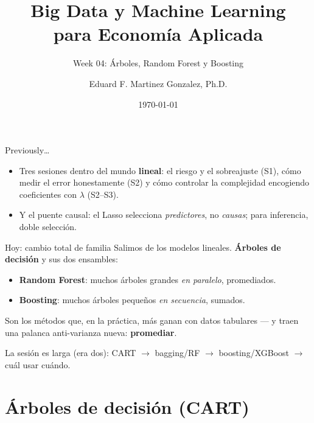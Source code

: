 \documentclass{beamer}
\title[BDML]{Big Data y Machine Learning \\ para Economía Aplicada}
\subtitle{Week 04: Árboles, Random Forest y Boosting}
\author{Eduard F. Martinez Gonzalez, Ph.D.}
\institute[]{Departamento de Economía, Universidad Icesi}
\date{\today}
\newcommand{\1}{\mathbb{I}}
\begin{document}
\begin{frame}
\titlepage
\end{frame}

\begin{frame}{Previously\ldots}
\small
\begin{itemize}\itemsep5pt
  \item Tres sesiones dentro del mundo \textbf{lineal}: el riesgo y el sobreajuste (S1), cómo medir el error honestamente (S2) y cómo controlar la complejidad encogiendo coeficientes con $\lambda$ (S2--S3).
  \item Y el puente causal: el Lasso selecciona \emph{predictores}, no \emph{causas}; para inferencia, doble selección.
\end{itemize}
\pause

\vspace{0.2cm}
\begin{block}{Hoy: cambio total de familia}
Salimos de los modelos lineales. \textbf{Árboles de decisión} y sus dos ensambles:
\begin{itemize}\itemsep2pt
  \item \textbf{Random Forest}: muchos árboles grandes \emph{en paralelo}, promediados.
  \item \textbf{Boosting}: muchos árboles pequeños \emph{en secuencia}, sumados.
\end{itemize}
Son los métodos que, en la práctica, más ganan con datos tabulares --- y traen una palanca anti-varianza nueva: \textbf{promediar}.
\end{block}
\pause

\vspace{0.1cm}
La sesión es larga (era dos): CART $\rightarrow$ bagging/RF $\rightarrow$ boosting/XGBoost $\rightarrow$ cuál usar cuándo.
\end{frame}


\section{Árboles de decisión (CART)}
\begin{frame}[noframenumbering]
\tableofcontents[currentsection]
\end{frame}
\end{document}

